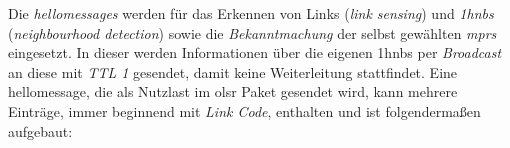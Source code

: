 Die \textit{\glspl{hellomessage}} werden für das Erkennen von Links (\textit{link sensing}) und \textit{\glspl{1hnb}} (\textit{neighbourhood detection}) sowie die \textit{Bekanntmachung} der selbst gewählten \textit{\glspl{mpr}} eingesetzt. In dieser werden Informationen über die eigenen \glspl{1hnb} per \textit{Broadcast} an diese mit \textit{TTL 1} gesendet, damit keine Weiterleitung stattfindet. Eine \gls{hellomessage}, die als Nutzlast im \gls{olsr} Paket gesendet wird, kann mehrere Einträge, immer beginnend mit \textit{Link Code}, enthalten und ist folgendermaßen aufgebaut:


